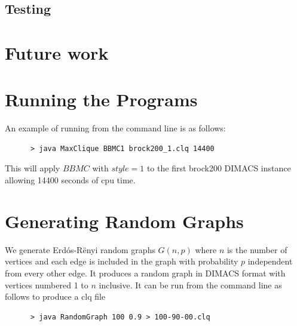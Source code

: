 \documentclass{l4proj}
\begin{document}
\section{Testing}

\chapter{Future work}

\begin{appendices}

\chapter{Running the Programs}
An example of running from the command line is as follows:
\begin{verbatim}
      > java MaxClique BBMC1 brock200_1.clq 14400
\end{verbatim}
This will apply $BBMC$ with $style = 1$ to the first brock200 DIMACS instance allowing 14400 seconds of cpu time.

\chapter{Generating Random Graphs}
\label{sec:randomGraph}
We generate Erd\'{o}s-R\"{e}nyi random graphs $G(n,p)$ where $n$ is the number of vertices and
each edge is included in the graph with probability $p$ independent from every other edge. It produces
a random graph in DIMACS format with vertices numbered 1 to $n$ inclusive. It can be run from the command line as follows to produce 
a clq file
\begin{verbatim}
      > java RandomGraph 100 0.9 > 100-90-00.clq
\end{verbatim}
\end{appendices}




\end{document}
